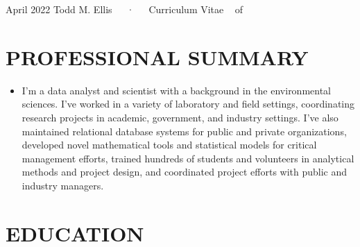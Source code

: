 \documentclass[11pt,a4paper,]{awesome-cv}
\providecommand{\tightlist}{%
	\setlength{\itemsep}{0pt}\setlength{\parskip}{0pt}}
\begin{document}
\makecvheader

\makecvfooter
  {April 2022}
    {Todd M. Ellis~~~·~~~Curriculum Vitae}
  {\thepage~ of \pageref{LastPage}~}





\hypertarget{professional-summary}{%
\section{PROFESSIONAL SUMMARY}\label{professional-summary}}

\begin{itemize}
\tightlist
\item
  I'm a data analyst and scientist with a background in the
  environmental sciences. I've worked in a variety of laboratory and
  field settings, coordinating research projects in academic,
  government, and industry settings. I've also maintained relational
  database systems for public and private organizations, developed novel
  mathematical tools and statistical models for critical management
  efforts, trained hundreds of students and volunteers in analytical
  methods and project design, and coordinated project efforts with
  public and industry managers.
\end{itemize}

\hypertarget{education}{%
\section{EDUCATION}\label{education}}
\end{document}
